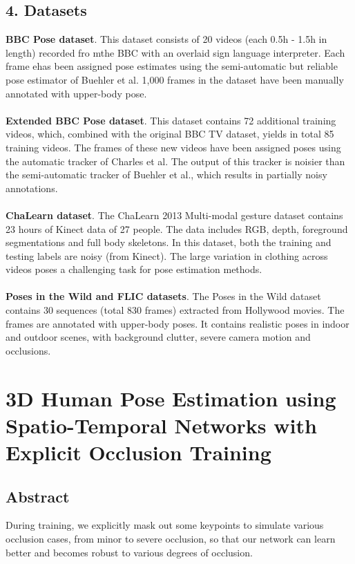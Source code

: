 \documentclass[a4paper]{report}
\begin{document}
\section*{4. Datasets}
\textbf{BBC Pose dataset}. This dataset consists of 20 videos (each 0.5h - 1.5h in length) recorded fro mthe BBC with an overlaid sign language interpreter. Each frame ehas been assigned pose estimates using the semi-automatic but reliable pose estimator of Buehler et al. 1,000 frames in the dataset have been manually annotated with upper-body pose.
\\
\\
\textbf{Extended BBC Pose dataset}. This dataset contains 72 additional training videos, which, combined with the original BBC TV dataset, yields in total 85 training videos. The frames of these new videos have been assigned poses using the automatic tracker of Charles et al. The output of this tracker is noisier than the semi-automatic tracker of Buehler et al., which results in partially noisy annotations.
\\
\\
\textbf{ChaLearn dataset}. The ChaLearn 2013 Multi-modal gesture dataset contains 23 hours of Kinect data of 27 people. The data includes RGB, depth, foreground segmentations and full body skeletons. In this dataset, both the training and testing labels are noisy (from Kinect). The large variation in clothing across videos poses a challenging task for pose estimation methods.
\\
\\
\textbf{Poses in the Wild and FLIC datasets}. The Poses in the Wild dataset contains 30 sequences (total 830 frames) extracted from Hollywood movies. The frames are annotated with upper-body poses. It contains realistic poses in indoor and outdoor scenes, with background clutter, severe camera motion and occlusions.

\chapter*{3D Human Pose Estimation using Spatio-Temporal Networks with Explicit Occlusion Training}

\section*{Abstract}
During training, we explicitly mask out some keypoints to simulate various occlusion cases, from minor to severe occlusion, so that our network can learn better and becomes robust to various degrees of occlusion.
\end{document}
